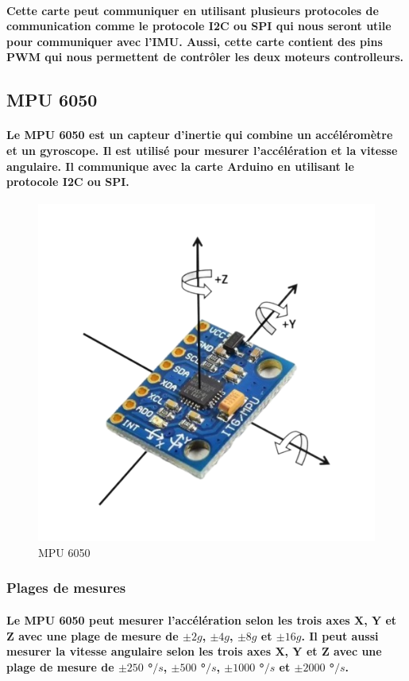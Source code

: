 \paragraph{
	Cette carte peut communiquer en utilisant plusieurs protocoles de communication comme le protocole I2C ou SPI qui nous seront utile pour communiquer avec l'IMU. Aussi, cette carte contient des pins PWM qui nous permettent de contrôler les deux moteurs controlleurs.
}

\subsection{MPU 6050}

\paragraph{Le MPU 6050 est un capteur d'inertie qui combine un accéléromètre et un gyroscope. Il est utilisé pour mesurer l'accélération et la vitesse angulaire. Il communique avec la carte Arduino en utilisant le protocole I2C ou SPI.}

\begin{figure}[!htpb]
	\centering
	\includegraphics[width=0.7\linewidth]{Figures/MPU6050.png}
	\caption{MPU 6050}
	\label{fig:MPU6050}
\end{figure}

\subsubsection{Plages de mesures}

\paragraph{Le MPU 6050 peut mesurer l'accélération selon les trois axes X, Y et Z avec une plage de mesure de $\pm 2g$, $\pm 4g$, $\pm 8g$ et $\pm 16g$. Il peut aussi mesurer la vitesse angulaire selon les trois axes X, Y et Z avec une plage de mesure de $\pm 250$ °$/s$, $\pm 500$ °$/s$, $\pm 1000$ °$/s$ et $\pm 2000$ °$/s$.}


